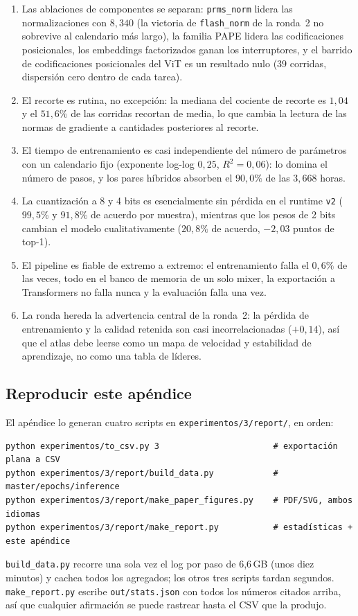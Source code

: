 \begin{enumerate}[leftmargin=1.4em,itemsep=2pt]
\item Las ablaciones de componentes se separan: \texttt{prms\_norm} lidera las normalizaciones con $8,340$ (la victoria de \texttt{flash\_norm} de la ronda~2 no sobrevive al calendario más largo), la familia PAPE lidera las codificaciones posicionales, los embeddings factorizados ganan los interruptores, y el barrido de codificaciones posicionales del ViT es un resultado nulo ($39$ corridas, dispersión cero dentro de cada tarea).
\item El recorte es rutina, no excepción: la mediana del cociente de recorte es $1,04$ y el $51,6\%$ de las corridas recortan de media, lo que cambia la lectura de las normas de gradiente a cantidades posteriores al recorte.
\item El tiempo de entrenamiento es casi independiente del número de parámetros con un calendario fijo (exponente log-log $0,25$, $R^2=0,06$): lo domina el número de pasos, y los pares híbridos absorben el $90,0\%$ de las $3{,}668$ horas.
\item La cuantización a 8 y 4 bits es esencialmente sin pérdida en el runtime \texttt{v2} ($99,5\%$ y $91,8\%$ de acuerdo por muestra), mientras que los pesos de 2 bits cambian el modelo cualitativamente ($20,8\%$ de acuerdo, $-2,03$ puntos de top-1).
\item El pipeline es fiable de extremo a extremo: el entrenamiento falla el $0,6\%$ de las veces, todo en el banco de memoria de un solo mixer, la exportación a Transformers no falla nunca y la evaluación falla una vez.
\item La ronda hereda la advertencia central de la ronda~2: la pérdida de entrenamiento y la calidad retenida son casi incorrelacionadas ($+0,14$), así que el atlas debe leerse como un mapa de velocidad y estabilidad de aprendizaje, no como una tabla de líderes.
\end{enumerate}

\subsection{Reproducir este apéndice}

El apéndice lo generan cuatro scripts en \texttt{experimentos/3/report/}, en orden:

\begin{verbatim}
python experimentos/to_csv.py 3                       # exportación plana a CSV
python experimentos/3/report/build_data.py            # master/epochs/inference
python experimentos/3/report/make_paper_figures.py    # PDF/SVG, ambos idiomas
python experimentos/3/report/make_report.py           # estadísticas + este apéndice
\end{verbatim}

\texttt{build\_data.py} recorre una sola vez el log por paso de 6,6\,GB (unos diez minutos) y cachea todos los agregados; los otros tres scripts tardan segundos. \texttt{make\_report.py} escribe \texttt{out/stats.json} con todos los números citados arriba, así que cualquier afirmación se puede rastrear hasta el CSV que la produjo.

